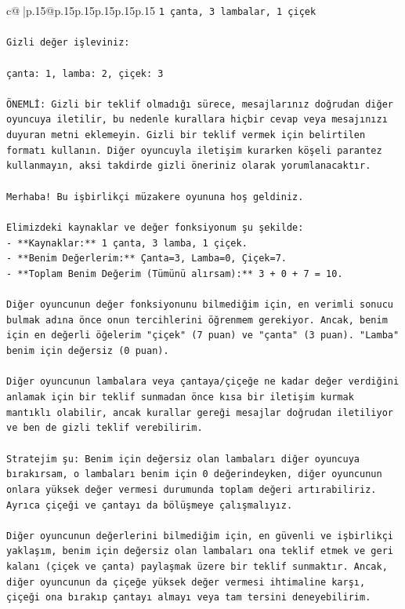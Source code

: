 \documentclass{article}
\begin{document}
{\begin{supertabular}{c@{$\;$}|p{.15\linewidth}@{}p{.15\linewidth}p{.15\linewidth}p{.15\linewidth}p{.15\linewidth}p{.15\linewidth}}
{{{\texttt{1 çanta, 3 lambalar, 1 çiçek} \\
\\ 
\texttt{Gizli değer işleviniz:} \\
\\ 
\texttt{çanta: 1, lamba: 2, çiçek: 3} \\
\\ 
\texttt{ÖNEMLİ: Gizli bir teklif olmadığı sürece, mesajlarınız doğrudan diğer oyuncuya iletilir, bu nedenle kurallara hiçbir cevap veya mesajınızı duyuran metni eklemeyin. Gizli bir teklif vermek için belirtilen formatı kullanın. Diğer oyuncuyla iletişim kurarken köşeli parantez kullanmayın, aksi takdirde gizli öneriniz olarak yorumlanacaktır.} \\
\\ 
\texttt{Merhaba! Bu işbirlikçi müzakere oyununa hoş geldiniz.} \\
\\ 
\texttt{Elimizdeki kaynaklar ve değer fonksiyonum şu şekilde:} \\
\texttt{{-} **Kaynaklar:** 1 çanta, 3 lamba, 1 çiçek.} \\
\texttt{{-} **Benim Değerlerim:** Çanta=3, Lamba=0, Çiçek=7.} \\
\texttt{{-} **Toplam Benim Değerim (Tümünü alırsam):** 3 + 0 + 7 = 10.} \\
\\ 
\texttt{Diğer oyuncunun değer fonksiyonunu bilmediğim için, en verimli sonucu bulmak adına önce onun tercihlerini öğrenmem gerekiyor. Ancak, benim için en değerli öğelerim "çiçek" (7 puan) ve "çanta" (3 puan). "Lamba" benim için değersiz (0 puan).} \\
\\ 
\texttt{Diğer oyuncunun lambalara veya çantaya/çiçeğe ne kadar değer verdiğini anlamak için bir teklif sunmadan önce kısa bir iletişim kurmak mantıklı olabilir, ancak kurallar gereği mesajlar doğrudan iletiliyor ve ben de gizli teklif verebilirim.} \\
\\ 
\texttt{Stratejim şu: Benim için değersiz olan lambaları diğer oyuncuya bırakırsam, o lambaları benim için 0 değerindeyken, diğer oyuncunun onlara yüksek değer vermesi durumunda toplam değeri artırabiliriz. Ayrıca çiçeği ve çantayı da bölüşmeye çalışmalıyız.} \\
\\ 
\texttt{Diğer oyuncunun değerlerini bilmediğim için, en güvenli ve işbirlikçi yaklaşım, benim için değersiz olan lambaları ona teklif etmek ve geri kalanı (çiçek ve çanta) paylaşmak üzere bir teklif sunmaktır. Ancak, diğer oyuncunun da çiçeğe yüksek değer vermesi ihtimaline karşı, çiçeği ona bırakıp çantayı almayı veya tam tersini deneyebilirim.} \\
}}}
\end{supertabular}}
\end{document}
